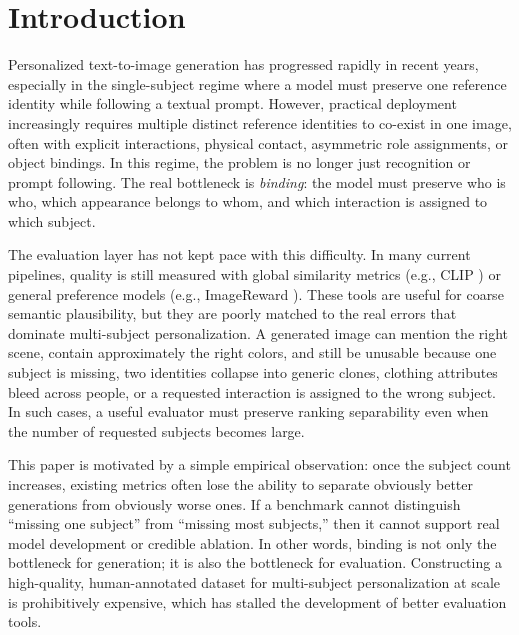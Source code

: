 \section{Introduction}

Personalized text-to-image generation has progressed rapidly in recent years, especially in the single-subject regime where a model must preserve one reference identity while following a textual prompt. However, practical deployment increasingly requires multiple distinct reference identities to co-exist in one image, often with explicit interactions, physical contact, asymmetric role assignments, or object bindings. In this regime, the problem is no longer just recognition or prompt following. The real bottleneck is \emph{binding}: the model must preserve who is who, which appearance belongs to whom, and which interaction is assigned to which subject.

The evaluation layer has not kept pace with this difficulty. In many current pipelines, quality is still measured with global similarity metrics (e.g., CLIP \cite{radford2021learning}) or general preference models (e.g., ImageReward \cite{xu2023imagereward}). These tools are useful for coarse semantic plausibility, but they are poorly matched to the real errors that dominate multi-subject personalization. A generated image can mention the right scene, contain approximately the right colors, and still be unusable because one subject is missing, two identities collapse into generic clones, clothing attributes bleed across people, or a requested interaction is assigned to the wrong subject. In such cases, a useful evaluator must preserve ranking separability even when the number of requested subjects becomes large.

This paper is motivated by a simple empirical observation: once the subject count increases, existing metrics often lose the ability to separate obviously better generations from obviously worse ones. If a benchmark cannot distinguish ``missing one subject'' from ``missing most subjects,'' then it cannot support real model development or credible ablation. In other words, binding is not only the bottleneck for generation; it is also the bottleneck for evaluation. Constructing a high-quality, human-annotated dataset for multi-subject personalization at scale is prohibitively expensive, which has stalled the development of better evaluation tools.

